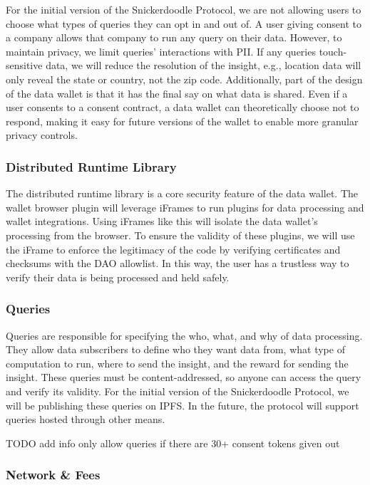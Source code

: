 For the initial version of the Snickerdoodle Protocol, we are not allowing users to choose what types of queries they can opt in and out of. A user giving 
consent to a company allows that company to run any query on their data. However, to maintain privacy, we limit queries' interactions with PII. If any 
queries touch-sensitive data, we will reduce the resolution of the insight, e.g., location data will only reveal the state or country, not the zip code. 
Additionally, part of the design of the data wallet is that it has the final say on what data is shared. Even if a user consents to a consent contract, a 
data wallet can theoretically choose not to respond, making it easy for future versions of the wallet to enable more granular privacy controls.

\subsubsection{Distributed Runtime Library}

The distributed runtime library is a core security feature of the data wallet. The wallet browser plugin will leverage iFrames to run plugins for data 
processing and wallet integrations. Using iFrames like this will isolate the data wallet's processing from the browser. To ensure the validity of these 
plugins, we will use the iFrame to enforce the legitimacy of the code by verifying certificates and checksums with the DAO allowlist. In this way, the 
user has a trustless way to verify their data is being processed and held safely.

\subsubsection{Queries}

Queries are responsible for specifying the who, what, and why of data processing. They allow data subscribers to define who they want data from, what type 
of computation to run, where to send the insight, and the reward for sending the insight. These queries must be content-addressed, so anyone can access the 
query and verify its validity. For the initial version of the Snickerdoodle Protocol, we will be publishing these queries on IPFS. In the future, the protocol 
will support queries hosted through other means.

TODO add info only allow queries if there are 30+ consent tokens given out

\subsubsection{Network \& Fees}

